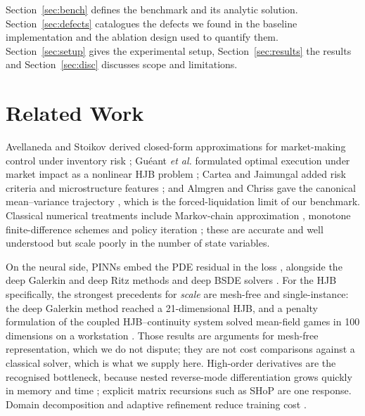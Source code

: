 \documentclass[conference]{IEEEtran}
\begin{document}
Section~\ref{sec:bench} defines the benchmark and its analytic solution.
Section~\ref{sec:defects} catalogues the defects we found in the baseline implementation and
the ablation design used to quantify them. Section~\ref{sec:setup} gives the experimental
setup, Section~\ref{sec:results} the results and Section~\ref{sec:disc} discusses scope and
limitations.

\section{Related Work}

Avellaneda and Stoikov derived closed-form approximations for market-making control under
inventory risk \cite{avellaneda2008high}; Gu\'eant \emph{et al.} formulated optimal execution
under market impact as a nonlinear HJB problem \cite{gueant2013dealing}; Cartea and Jaimungal
added risk criteria and microstructure features \cite{cartea2015risk,cartea2015algorithmic}; and
Almgren and Chriss gave the canonical mean--variance trajectory \cite{almgren2000optimal}, which
is the forced-liquidation limit of our benchmark. Classical numerical treatments include
Markov-chain approximation \cite{kushner1990numerical}, monotone finite-difference schemes
\cite{forsyth2017epsilon} and policy iteration \cite{howard1960dynamic,bertsekas2012dynamic};
these are accurate and well understood but scale poorly in the number of state variables.

On the neural side, PINNs embed the PDE residual in the loss \cite{raissi2019physics}, alongside
the deep Galerkin and deep Ritz methods \cite{sirignano2018dgm,yu2018deep} and deep BSDE solvers
\cite{han2018solving,e2017deep}. For the HJB specifically, the strongest precedents for
\emph{scale} are mesh-free and single-instance: the deep Galerkin method reached a
21-dimensional HJB, and a penalty formulation of the coupled HJB--continuity system solved
mean-field games in 100 dimensions on a workstation \cite{carmona2020machine}. Those results are
arguments for mesh-free representation, which we do not dispute; they are not cost comparisons
against a classical solver, which is what we supply here.
High-order derivatives are the recognised bottleneck, because
nested reverse-mode differentiation grows quickly in memory and time
\cite{hutzenthaler2022overcoming}; explicit matrix recursions such as SHoP \cite{xiao2024shop}
are one response. Domain decomposition and adaptive refinement reduce training cost
\cite{meng2020ppinn,moseley2021finite}.
\end{document}
